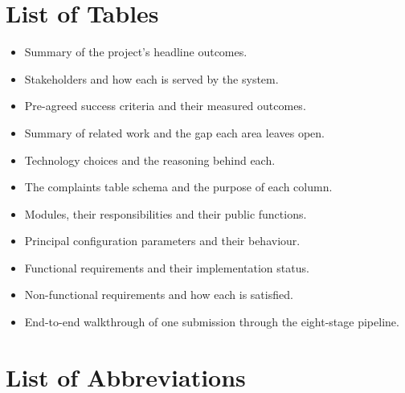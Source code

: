\documentclass[10pt,letterpaper,oneside]{article}\usepackage{geometry}\geometry{top=1in,bottom=1in,left=1in,right=1in,includeheadfoot}\usepackage{xcolor}\definecolor{color@navy}{HTML}{1F3B63}\definecolor{color@grey}{HTML}{404040}\definecolor{color@hdr}{HTML}{F2F4F7}\usepackage{titlesec}\titleformat{\section}  {\normalfont\huge\bfseries\color@navy}  {}{0pt}{\MakeUppercase}\titleformat{\subsection}  {\normalfont\Large\bfseries\color@navy}  {}{0pt}{}\titleformat{\subsubsection}  {\normalfont\large\bfseries\color@navy}  {}{0pt}{}\titlespacing*{\section}{0pt}{14pt}{6pt}\titlespacing*{\subsection}{0pt}{10pt}{4pt}\titlespacing*{\subsubsection}{0pt}{8pt}{3pt}\setlength{\parindent}{0pt}\setlength{\parskip}{0.6em}\parindent=0pt\usepackage{enumitem}\setlist{nosep,leftmargin=*,itemsep=0pt,topsep=2pt,partopsep=0pt}\usepackage{array}\usepackage{booktabs}\usepackage{caption}\captionsetup{font={small,it},labelfont={bf},labelsep=period,  parskip=2pt,skip=4pt,list=no}\captionsetup[table]{labelfont={bf,small,color@navy},name=Table}\usepackage{graphicx}\usepackage{verbatim}\usepackage{ragged2e}\usepackage{longtable}\usepackage{tabularx}\usepackage{multirow}\usepackage{colortbl}\definecolor{rowshade}{HTML}{F2F4F7}\usepackage{tikz}\usetikzlibrary{positioning,calc}\usepackage[hidelinks]{hyperref}\hypersetup{colorlinks=true,linkcolor=color@navy,urlcolor=color@navy}\pagestyle{fancy}\fancyhf{}\renewcommand{\headrulewidth}{0.4pt}\fancyhead[L]{\small\color@navy CivicSense — Project Report}\fancyhead[R]{\small\color@grey October 11, 2026}\fancyfoot[C]{\small\color@grey An Integrated Intelligent Triage Pipelin}\fancyfoot[R]{\small\color@grey Page \thepage}\usepackage{setspace}\setstretch{1.15}\AtBeginDocument{  \hypersetup{pdftitle={An Integrated Intelligent Triage Pipeline for AI-Enhanced Citizen Complaint Management},    pdfauthor={CivicSense Project Team},    pdfsubject={Project Report},    pdfkeywords={smart cities, NLP, complaint management, e-governance},    pdfcreator={CivicSense Project Team}  }}
\begin{document}
\section*{List of Tables}

\begin{itemize}[leftmargin=1.5em, itemindent=0pt, label=\numberline{}, itemsep=2pt]
\item Summary of the project’s headline outcomes.
\item Stakeholders and how each is served by the system.
\item Pre-agreed success criteria and their measured outcomes.
\item Summary of related work and the gap each area leaves open.
\item Technology choices and the reasoning behind each.
\item The complaints table schema and the purpose of each column.
\item Modules, their responsibilities and their public functions.
\item Principal configuration parameters and their behaviour.
\item Functional requirements and their implementation status.
\item Non-functional requirements and how each is satisfied.
\item End-to-end walkthrough of one submission through the eight-stage pipeline.
\end{itemize}
\newpage
{}
{}
\section*{List of Abbreviations}
\end{document}
